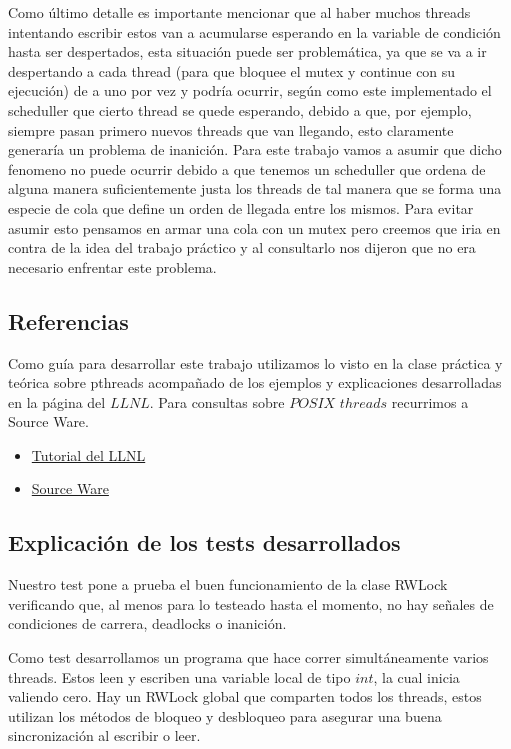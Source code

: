Como último detalle es importante mencionar que al haber muchos threads intentando escribir estos van a acumularse esperando en la variable de condición hasta ser despertados, esta situación puede ser problemática, ya que se va a ir despertando a cada thread (para que bloquee el mutex y continue con su ejecución) de a uno por vez y podría ocurrir, según como este implementado el scheduller que cierto thread se quede esperando, debido a que, por ejemplo, siempre pasan primero nuevos threads que van llegando, esto claramente generaría un problema de inanición. Para este trabajo vamos a asumir que dicho fenomeno no puede ocurrir debido a que tenemos un scheduller que ordena de alguna manera suficientemente justa los threads de tal manera que se forma una especie de cola que define un orden de llegada entre los mismos. Para evitar asumir esto pensamos en armar una cola con un mutex pero creemos que iria en contra de la idea del trabajo práctico y al consultarlo nos dijeron que no era necesario enfrentar este problema.

\subsection{Referencias}

Como guía para desarrollar este trabajo utilizamos lo visto en la clase práctica y teórica sobre pthreads acompañado de los ejemplos y explicaciones desarrolladas en la página del $LLNL$. Para consultas sobre $POSIX$ $threads$ recurrimos a Source Ware.

\begin{itemize}

\item \href{https://computing.llnl.gov/tutorials/pthreads/}{Tutorial del LLNL}

\item \href{https://www.sourceware.org/pthreads-win32/manual/}{Source Ware}

\end{itemize}

\subsection{Explicación de los tests desarrollados}

Nuestro test pone a prueba el buen funcionamiento de la clase RWLock verificando que, al menos para lo testeado hasta el momento, no hay señales de condiciones de carrera, deadlocks o inanición. 

Como test desarrollamos un programa que hace correr simultáneamente varios threads. Estos leen y escriben una variable local de tipo $int$, la cual inicia valiendo cero. Hay un RWLock global que comparten todos los threads, estos utilizan los métodos de bloqueo y desbloqueo para asegurar una buena sincronización al escribir o leer.

